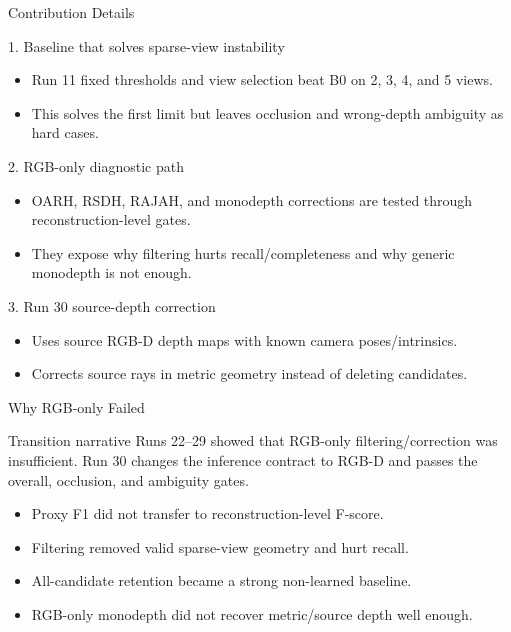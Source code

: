 \begin{frame}{Contribution Details}
  \footnotesize
  \begin{block}{1. Baseline that solves sparse-view instability}
    \begin{itemize}
      \item Run 11 fixed thresholds and view selection beat B0 on 2, 3, 4,
      and 5 views.
      \item This solves the first limit but leaves occlusion and wrong-depth
      ambiguity as hard cases.
    \end{itemize}
  \end{block}

  \begin{block}{2. RGB-only diagnostic path}
    \begin{itemize}
      \item OARH, RSDH, RAJAH, and monodepth corrections are tested through
      reconstruction-level gates.
      \item They expose why filtering hurts recall/completeness and why
      generic monodepth is not enough.
    \end{itemize}
  \end{block}

  \begin{block}{3. Run 30 source-depth correction}
    \begin{itemize}
      \item Uses source RGB-D depth maps with known camera poses/intrinsics.
      \item Corrects source rays in metric geometry instead of deleting
      candidates.
    \end{itemize}
  \end{block}
\end{frame}

\begin{frame}{Why RGB-only Failed}
  \footnotesize
  \begin{block}{Transition narrative}
    Runs 22--29 showed that RGB-only filtering/correction was insufficient. Run
    30 changes the inference contract to RGB-D and passes the overall,
    occlusion, and ambiguity gates.
  \end{block}

  \begin{itemize}
    \item Proxy F1 did not transfer to reconstruction-level F-score.
    \item Filtering removed valid sparse-view geometry and hurt recall.
    \item All-candidate retention became a strong non-learned baseline.
    \item RGB-only monodepth did not recover metric/source depth well enough.
  \end{itemize}
\end{frame}
